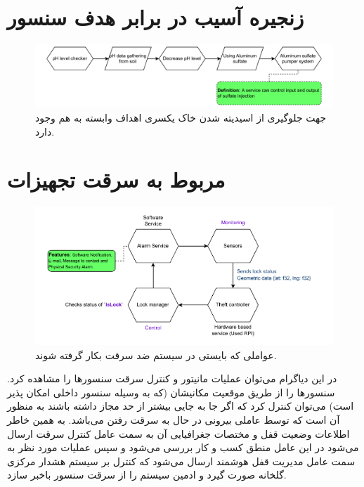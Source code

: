 \documentclass[a4paper]{report}
\begin{document}
\section*{زنجیره آسیب در برابر هدف سنسور }

\begin{figure}[H]
    \centering
    \includegraphics[width=1.0\textwidth]{assets/diagrams/ph_damage_chain_without_img.drawio.pdf}
    \caption{جهت جلوگیری از اسیدیته شدن خاک یکسری اهداف وابسته به هم وجود دارد.}
\end{figure}

\section*{ مربوط به سرقت تجهیزات}

\begin{figure}[H]
    \centering
    \includegraphics[width=1.0\textwidth]{assets/diagrams/sensor_theft_contex_diagram.drawio.pdf}
    \caption{عواملی که بایستی در سیستم ضد سرقت بکار گرفته شوند.}
    \label{fig:sensorTheftContextDiagram}
\end{figure}

در این دیاگرام می‌توان عملیات مانیتور و کنترل سرقت سنسور‌ها را مشاهده کرد.
سنسور‌ها را از طریق موقعیت مکانیشان (که به وسیله سنسور داخلی  امکان پذیر
است) می‌توان کنترل کرد که اگر جا به جایی بیشتر از حد مجاز داشته باشند به منظور
آن است که توسط عاملی بیرونی در حال به سرقت رفتن می‌باشد. به همین خاطر اطلاعات
وضعیت قفل و مختصات جغرافیایی آن به سمت عامل کنترل سرقت ارسال می‌شود در این عامل
منطق کسب و کار بررسی می‌شود و سپس عملیات مورد نظر به سمت عامل مدیریت قفل هوشمند
ارسال می‌شود که کنترل بر سیستم هشدار مرکزی گلخانه صورت گیرد و ادمین سیستم را از
سرقت سنسور باخبر سازد.
\end{document}
